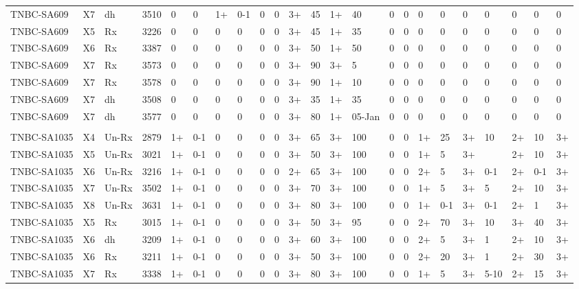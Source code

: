 \begin{landscape}
\begin{table}[]
{\begin{tabular}{lllllllllllllllllllllll}
TNBC-SA609 & X7 & dh & 3510 & 0 & 0 & 1+ & 0-1 & 0 & 0 & 3+ & 45 & 1+ & 40 & 0 & 0 & 0 & 0 & 0 & 0 & 0 & 0 & 0 \\
TNBC-SA609 & X5 & Rx & 3226 & 0 & 0 & 0 & 0 & 0 & 0 & 3+ & 45 & 1+ & 35 & 0 & 0 & 0 & 0 & 0 & 0 & 0 & 0 & 0 \\
TNBC-SA609 & X6 & Rx & 3387 & 0 & 0 & 0 & 0 & 0 & 0 & 3+ & 50 & 1+ & 50 & 0 & 0 & 0 & 0 & 0 & 0 & 0 & 0 & 0 \\
TNBC-SA609 & X7 & Rx & 3573 & 0 & 0 & 0 & 0 & 0 & 0 & 3+ & 90 & 3+ & 5 & 0 & 0 & 0 & 0 & 0 & 0 & 0 & 0 & 0 \\
TNBC-SA609 & X7 & Rx & 3578 & 0 & 0 & 0 & 0 & 0 & 0 & 3+ & 90 & 1+ & 10 & 0 & 0 & 0 & 0 & 0 & 0 & 0 & 0 & 0 \\
TNBC-SA609 & X7 & dh & 3508 & 0 & 0 & 0 & 0 & 0 & 0 & 3+ & 35 & 1+ & 35 & 0 & 0 & 0 & 0 & 0 & 0 & 0 & 0 & 0 \\
TNBC-SA609 & X7 & dh & 3577 & 0 & 0 & 0 & 0 & 0 & 0 & 3+ & 80 & 1+ & 05-Jan & 0 & 0 & 0 & 0 & 0 & 0 & 0 & 0 & 0 \\
 &  &  &  &  &  &  &  &  &  &  &  &  &  &  &  &  &  &  &  &  &  &  \\
TNBC-SA1035 & X4 & Un-Rx & 2879 & 1+ & 0-1 & 0 & 0 & 0 & 0 & 3+ & 65 & 3+ & 100 & 0 & 0 & 1+ & 25 & 3+ & 10 & 2+ & 10 & 3+ \\
TNBC-SA1035 & X5 & Un-Rx & 3021 & 1+ & 0-1 & 0 & 0 & 0 & 0 & 3+ & 50 & 3+ & 100 & 0 & 0 & 1+ & 5 & 3+ &  & 2+ & 10 & 3+ \\
TNBC-SA1035 & X6 & Un-Rx & 3216 & 1+ & 0-1 & 0 & 0 & 0 & 0 & 2+ & 65 & 3+ & 100 & 0 & 0 & 2+ & 5 & 3+ & 0-1 & 2+ & 0-1 & 3+ \\
TNBC-SA1035 & X7 & Un-Rx & 3502 & 1+ & 0-1 & 0 & 0 & 0 & 0 & 3+ & 70 & 3+ & 100 & 0 & 0 & 1+ & 5 & 3+ & 5 & 2+ & 10 & 3+ \\
TNBC-SA1035 & X8 & Un-Rx & 3631 & 1+ & 0-1 & 0 & 0 & 0 & 0 & 3+ & 80 & 3+ & 100 & 0 & 0 & 1+ & 0-1 & 3+ & 0-1 & 2+ & 1 & 3+ \\
TNBC-SA1035 & X5 & Rx & 3015 & 1+ & 0-1 & 0 & 0 & 0 & 0 & 3+ & 50 & 3+ & 95 & 0 & 0 & 2+ & 70 & 3+ & 10 & 3+ & 40 & 3+ \\
TNBC-SA1035 & X6 & dh & 3209 & 1+ & 0-1 & 0 & 0 & 0 & 0 & 3+ & 60 & 3+ & 100 & 0 & 0 & 2+ & 5 & 3+ & 1 & 2+ & 10 & 3+ \\
TNBC-SA1035 & X6 & Rx & 3211 & 1+ & 0-1 & 0 & 0 & 0 & 0 & 3+ & 50 & 3+ & 100 & 0 & 0 & 2+ & 20 & 3+ & 1 & 2+ & 30 & 3+ \\
TNBC-SA1035 & X7 & Rx & 3338 & 1+ & 0-1 & 0 & 0 & 0 & 0 & 3+ & 80 & 3+ & 100 & 0 & 0 & 1+ & 5 & 3+ & 5-10 & 2+ & 15 & 3+ \\

\end{tabular}}
\end{table}
\end{landscape}
